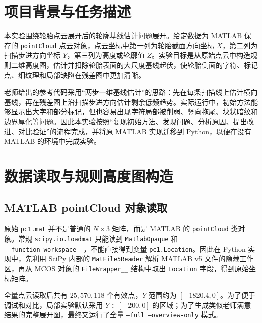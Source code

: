 \documentclass[12pt,hyperref,a4paper,UTF8,fontset=fandol]{ctexart}
\begin{document}
\cover

\thispagestyle{empty}

\newpage
{}
\tableofcontents

\newpage
{}

\section{项目背景与任务描述}

本实验围绕轮胎点云展开后的轮廓基线估计问题展开。给定数据为 MATLAB 保存的 \texttt{pointCloud} 点云对象，点云坐标中第一列为轮胎截面方向坐标 $X$，第二列为扫描步进方向坐标 $Y$，第三列为高度或轮廓值 $Z$。实验目标是从原始点云中构造规则二维高度图，估计并扣除轮胎表面的大尺度基线起伏，使轮胎侧面的字符、标记点、细纹理和局部缺陷在残差图中更加清晰。

老师给出的参考代码采用“两步一维基线估计”的思路：先在每条扫描线上估计横向基线，再在残差图上沿扫描步进方向估计剩余低频趋势。实际运行中，初始方法能够显示出大字和部分标记，但也容易出现字符局部被削弱、竖向拖尾、块状暗纹和边界厚化等问题。因此本实验按照“复现初始方法、发现问题、分析原因、提出改进、对比验证”的流程完成，并将原 MATLAB 实现迁移到 Python，以便在没有 MATLAB 的环境中完成实验。

\section{数据读取与规则高度图构造}

\subsection{MATLAB pointCloud 对象读取}

原始 \texttt{pc1.mat} 并不是普通的 $N \times 3$ 矩阵，而是 MATLAB 的 \texttt{pointCloud} 类对象。常规 \texttt{scipy.io.loadmat} 只能读到 \texttt{MatlabOpaque} 和 \texttt{\_\_function\_workspace\_\_}，不能直接得到变量 \texttt{pc1.Location}。因此在 Python 实现中，先利用 SciPy 内部的 \texttt{MatFile5Reader} 解析 MATLAB v5 文件的隐藏工作区，再从 MCOS 对象的 \texttt{FileWrapper\_\_} 结构中取出 \texttt{Location} 字段，得到原始坐标矩阵。

全量点云读取后共有 $25,570,118$ 个有效点，$Y$ 范围约为 $[-1820.4, 0]$。为了便于调试和对比，局部实验默认采用 $Y \in [-200,0]$ 的区域；为了生成类似老师满意结果的完整展开图，最终又运行了全量 \texttt{--full --overview-only} 模式。
\end{document}
